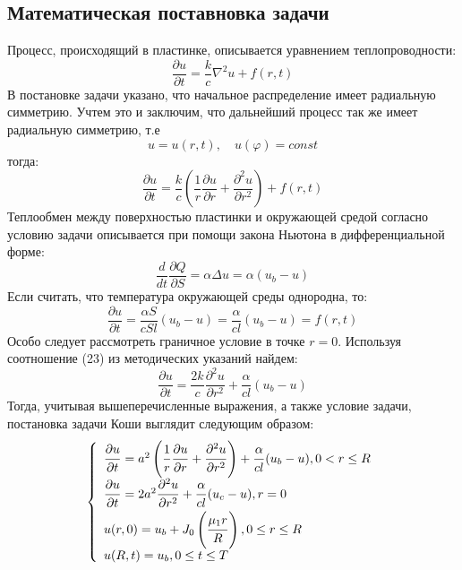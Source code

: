 \documentclass[a4paper,12pt,russian, fleqn]{extreport}
\begin{document}
	\subsection{Математическая поставновка задачи}
	Процесс, происходящий в пластинке, описывается уравнением теплопроводности:
	\begin{equation*}
	\dfrac{\partial u}{\partial t} = \dfrac{k}{c}\nabla^2u + f(r,t)
	\end{equation*}
	В постановке задачи указано, что начальное распределение имеет радиальную симметрию. Учтем это и заключим, что дальнейший процесс так же имеет радиальную симметрию, т.е 
	\begin{equation*}
	u = u(r,t), \quad u(\varphi) = const	
	\end{equation*}
	тогда:	
	\begin{equation*}
	\dfrac{\partial u}{\partial t} = \dfrac{k}{c} \left ( \dfrac{1}{r}\dfrac{\partial u}{\partial r} + \dfrac{\partial^2 u}{\partial r^2}\right ) + f(r,t)
	\end{equation*}
	Теплообмен между поверхностью пластинки и окружающей средой согласно условию задачи описывается при помощи закона Ньютона в дифференциальной форме:	
	\begin{equation*}
	\dfrac{d}{dt}\dfrac{\partial Q}{\partial S} = \alpha \Delta u  = \alpha (u_b - u)
	\end{equation*}
	Если считать, что температура окружающей среды однородна, то:	
	\begin{equation*}
	\dfrac{\partial u}{\partial t} = \dfrac{\alpha S}{cSl}(u_b - u) = \dfrac{\alpha}{cl}(u_b - u) = f(r,t)	
	\end{equation*}
	Особо следует рассмотреть граничное условие в точке $r = 0$. Используя соотношение (23) из методических указаний найдем:	
	\begin{equation*}
	\dfrac{\partial u}{\partial t} = \dfrac{2k}{c} \dfrac{\partial^2 u}{\partial r^2} + \dfrac{\alpha}{cl}(u_b - u)
	\end{equation*}
	Тогда, учитывая вышеперечисленные выражения, а также условие задачи, постановка задачи Коши выглядит следующим образом:	
	\begin{equation}\label{KoshiTask}
	\left \{
	\begin{array}{l}
	\dfrac{\strut \partial u}{\strut \partial t} = a^2 \left ( \dfrac{\strut 1}{\strut r}\dfrac{\strut \partial u}{\strut \partial r} + \dfrac{\strut \partial^2 u}{\strut \partial r^2}\right ) + \dfrac{\strut \alpha}{\strut cl}(u_b - u), 0 < r \leq R\\
	\dfrac{\strut \partial u}{\strut \partial t} = 2a^2 \dfrac{\strut \partial^2 u}{\strut \partial r^2} + \dfrac{\strut \alpha}{\strut cl}(u_c - u), r = 0 \\
	u(r, 0) = u_b + J_0\left(\dfrac{\strut \mu_1 r}{\strut R}\right), 0 \leq r \leq R \\
	u(R, t) = u_b, 0 \leq t \leq T
	\end{array}
	\right.
	\end{equation}
\end{document}
